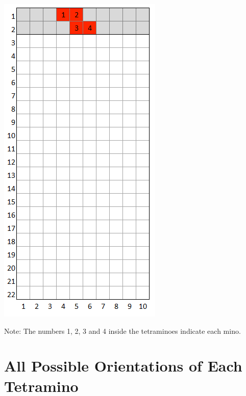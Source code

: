 \documentclass[a4paper]{article}
\begin{document}
	\begin{minipage}{0.33\textwidth}
		\centering
		\includegraphics[scale=0.4]{resources/img/minoes/mino_red}
		\label{fig:mino-red}
	\end{minipage}%

Note: The numbers 1, 2, 3 and 4 inside the tetraminoes indicate each mino.

\section{All Possible Orientations of Each Tetramino}
	
\end{document}
